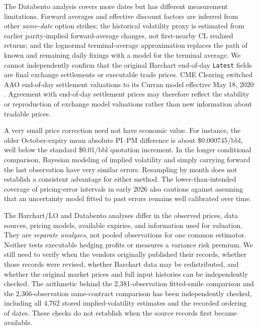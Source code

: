 The Databento analysis covers more dates but has different
measurement limitations. Forward averages and effective discount
factors are inferred from other \emph{same-date} option strikes;
the historical volatility proxy is estimated from earlier
parity-implied forward-average changes, not first-nearby CL
realized returns; and the lognormal terminal-average approximation
replaces the path of known and remaining daily fixings
with a model for the terminal average. We cannot independently confirm that the original Barchart
end-of-day \texttt{Latest} fields are final exchange
settlements or executable trade prices.
CME Clearing switched AAO end-of-day settlement valuations to
its Curran model effective May 18, 2020
\citep{cmeclearing2020curran}. Agreement with end-of-day settlement prices may therefore
reflect the stability or reproduction of exchange model
valuations rather than new information about tradable prices.

A very small price correction need not have economic value.
For instance, the older October-expiry mean absolute PI--PM
difference is about \$0.000745/bbl, well below the standard
\$0.01/bbl quotation increment. In the longer conditional comparison, Bayesian modeling of
implied volatility and simply carrying forward the last
observation have very similar errors. Resampling by month
does not establish a consistent advantage for either method. The lower-than-intended coverage of pricing-error intervals
in early 2026 also cautions against assuming that an uncertainty
model fitted to past errors remains well calibrated over time.

The Barchart/LO and Databento analyses differ in the
observed prices, data sources, pricing models, available
expiries, and information used for valuation. They
are \emph{separate analyses}, not pooled observations for one
common estimator. Neither tests executable hedging profits or measures a
variance risk premium. We still need to verify when the vendors originally published
their records, whether those records were revised, whether
Barchart data may be redistributed, and whether the original
market prices and full input histories can be independently checked.
The arithmetic behind the 2,381-observation fitted-smile
comparison and the 2,366-observation same-contract comparison
has been independently checked, including all 4,762 stored
implied-volatility estimates and the recorded ordering of dates. These checks do not establish when the source records first
became available.

